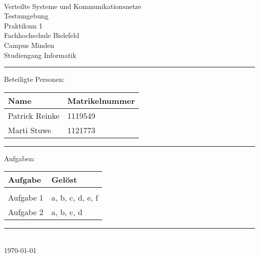 


\begin{titlepage}
   \mbox{}\vspace{5\baselineskip}\\
   \sffamily\huge
   \centering
   {\Huge Verteilte Systeme und Kommunikationsnetze} \\
  Testumgebung \\ \normalsize Praktikum  1
   \vspace{3\baselineskip}\\
   \rmfamily\Large
  Fachhochschule Bielefeld \\
  Campus Minden \\
  Studiengang Informatik
   \vspace{2\baselineskip}\\
\noindent\rule{15cm}{0.4pt}
Beteiligte Personen:
\begin{table}[H]
	\tablestyle
	\begin{tabular}{*{2}{v{0.45\textwidth}}}
		\hline
		\textbf{Name} &
		\textbf{Matrikelnummer} \tabularnewline
		\hline
		Patrick Reinke  & 1119549 \tabularnewline
		Marti Stuwe  & 1121773 \tabularnewline
	\end{tabular}
\end{table}

\centering
\noindent\rule{15cm}{0.4pt}
{\Large Aufgaben:}
\begin{table}[H]
	\tablestyle
	\begin{tabular}{*{2}{v{0.45\textwidth}}}
		\hline
		\textbf{Aufgabe} &
		\textbf{Gelöst} \tabularnewline
		\hline
		 \tabularnewline
		Aufgabe 1 & a, b, c, d, e, f \tabularnewline
		Aufgabe 2 & a, b, c, d
		
	\end{tabular}
\end{table}
   \noindent\rule{15cm}{0.4pt}
      \vspace{1\baselineskip}\\
   \today
\end{titlepage}

